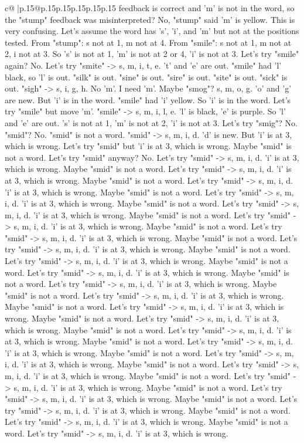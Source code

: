 \documentclass{article}
\begin{document}
{\begin{supertabular}{c@{$\;$}|p{.15\linewidth}@{}p{.15\linewidth}p{.15\linewidth}p{.15\linewidth}p{.15\linewidth}p{.15\linewidth}}
{{{feedback is correct and 'm' is not in the word, so the "stump" feedback was misinterpreted? No, "stump" said 'm' is yellow. This is very confusing. Let's assume the word has 's', 'i', and 'm' but not at the positions tested. From "stump": s not at 1, m not at 4. From "smile": s not at 1, m not at 2, i not at 3. So 's' is not at 1, 'm' is not at 2 or 4, 'i' is not at 3. Let's try "smile" again? No. Let's try "smite" {-}> s, m, i, t, e. 't' and 'e' are out. "smile" had 'l' black, so 'l' is out. "silk" is out. "sine" is out. "sire" is out. "site" is out. "sick" is out. "sigh" {-}> s, i, g, h. No 'm'. I need 'm'. Maybe "smog"? s, m, o, g. 'o' and 'g' are new. But 'i' is in the word. "smile" had 'i' yellow. So 'i' is in the word. Let's try "smile" but move 'm'. "smile" {-}> s, m, i, l, e. 'l' is black, 'e' is purple. So 'l' and 'e' are out. 's' is not at 1, 'm' is not at 2, 'i' is not at 3. Let's try "smig"? No. "smid"? No. "smid" is not a word. "smid" {-}> s, m, i, d. 'd' is new. But 'i' is at 3, which is wrong. Let's try "smid" but 'i' is at 3, which is wrong. Maybe "smid" is not a word. Let's try "smid" anyway? No. Let's try "smid" {-}> s, m, i, d. 'i' is at 3, which is wrong. Maybe "smid" is not a word. Let's try "smid" {-}> s, m, i, d. 'i' is at 3, which is wrong. Maybe "smid" is not a word. Let's try "smid" {-}> s, m, i, d. 'i' is at 3, which is wrong. Maybe "smid" is not a word. Let's try "smid" {-}> s, m, i, d. 'i' is at 3, which is wrong. Maybe "smid" is not a word. Let's try "smid" {-}> s, m, i, d. 'i' is at 3, which is wrong. Maybe "smid" is not a word. Let's try "smid" {-}> s, m, i, d. 'i' is at 3, which is wrong. Maybe "smid" is not a word. Let's try "smid" {-}> s, m, i, d. 'i' is at 3, which is wrong. Maybe "smid" is not a word. Let's try "smid" {-}> s, m, i, d. 'i' is at 3, which is wrong. Maybe "smid" is not a word. Let's try "smid" {-}> s, m, i, d. 'i' is at 3, which is wrong. Maybe "smid" is not a word. Let's try "smid" {-}> s, m, i, d. 'i' is at 3, which is wrong. Maybe "smid" is not a word. Let's try "smid" {-}> s, m, i, d. 'i' is at 3, which is wrong. Maybe "smid" is not a word. Let's try "smid" {-}> s, m, i, d. 'i' is at 3, which is wrong. Maybe "smid" is not a word. Let's try "smid" {-}> s, m, i, d. 'i' is at 3, which is wrong. Maybe "smid" is not a word. Let's try "smid" {-}> s, m, i, d. 'i' is at 3, which is wrong. Maybe "smid" is not a word. Let's try "smid" {-}> s, m, i, d. 'i' is at 3, which is wrong. Maybe "smid" is not a word. Let's try "smid" {-}> s, m, i, d. 'i' is at 3, which is wrong. Maybe "smid" is not a word. Let's try "smid" {-}> s, m, i, d. 'i' is at 3, which is wrong. Maybe "smid" is not a word. Let's try "smid" {-}> s, m, i, d. 'i' is at 3, which is wrong. Maybe "smid" is not a word. Let's try "smid" {-}> s, m, i, d. 'i' is at 3, which is wrong. Maybe "smid" is not a word. Let's try "smid" {-}> s, m, i, d. 'i' is at 3, which is wrong. Maybe "smid" is not a word. Let's try "smid" {-}> s, m, i, d. 'i' is at 3, which is wrong. Maybe "smid" is not a word. Let's try "smid" {-}> s, m, i, d. 'i' is at 3, which is wrong. Maybe "smid" is not a word. Let's try "smid" {-}> s, m, i, d. 'i' is at 3, which is wrong. }}}
\end{supertabular}}
\end{document}

